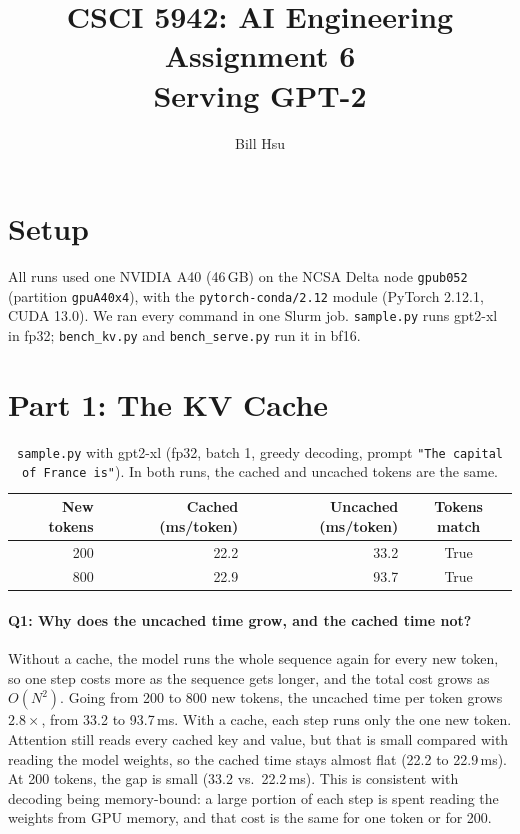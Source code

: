 \documentclass[10pt]{article}
\begin{document}
\title{CSCI 5942: AI Engineering Assignment 6\\Serving GPT-2}
\author{Bill Hsu}
\maketitle

\section*{Setup}

All runs used one NVIDIA A40 (46\,GB) on the NCSA Delta node
\texttt{gpub052} (partition \texttt{gpuA40x4}), with the
\texttt{pytorch-conda/2.12} module (PyTorch 2.12.1, CUDA 13.0). We ran
every command in one Slurm job. \texttt{sample.py} runs gpt2-xl in fp32; \texttt{bench\_kv.py}
and \texttt{bench\_serve.py} run it in bf16. 
\section*{Part 1: The KV Cache}

\begin{table}[htbp]
\caption{\texttt{sample.py} with gpt2-xl (fp32, batch 1, greedy decoding,
prompt \texttt{"The capital of France is"}). In both runs, the cached and
uncached tokens are the same.}
\label{tab:sample}
\centering
\begin{tabular}{rrrc}
\toprule
New tokens & Cached (ms/token) & Uncached (ms/token) & Tokens match \\
\midrule
200 & 22.2 & 33.2 & True \\
800 & 22.9 & 93.7 & True \\
\bottomrule
\end{tabular}
\end{table}

\paragraph{Q1: Why does the uncached time grow, and the cached time not?}
Without a cache, the model runs the whole sequence again for every new
token, so one step costs more as the sequence gets longer, and the total
cost grows as $O(N^2)$. Going from 200 to 800 new tokens, the uncached
time per token grows $2.8\times$, from 33.2 to 93.7\,ms. With a cache,
each step runs only the one new token. Attention still reads every cached
key and value, but that is small compared with reading the model weights,
so the cached time stays almost flat (22.2 to 22.9\,ms).
At 200 tokens, the gap is small (33.2 vs.\ 22.2\,ms). This is consistent with decoding
being memory-bound: a large portion of each step is spent reading the weights from GPU
memory, and that cost is the same for one token or for 200.
\end{document}
